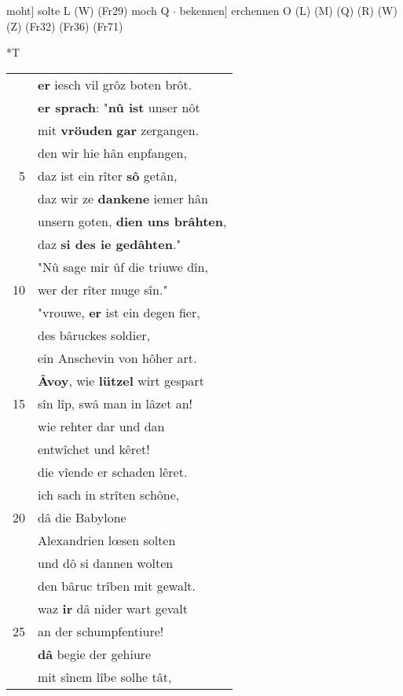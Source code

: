 \documentclass[8pt,a4paper,notitlepage]{article}
\begin{document}
\begin{table}[ht]
\begin{minipage}[t]{0.5\linewidth}
moht] solte L (W) (Fr29) moch Q  $\cdot$ bekennen] erchennen O (L) (M) (Q) (R) (W) (Z) (Fr32) (Fr36) (Fr71) \newline
\end{minipage}
\hspace{0.5cm}
\begin{minipage}[t]{0.5\linewidth}
\small
\begin{center}*T
\end{center}
\begin{tabular}{rl}
 & \textbf{er} iesch vil grôz boten brôt.\\ 
 & \textbf{er sprach}: "\textbf{nû ist} unser nôt\\ 
 & mit \textbf{vröuden} \textbf{gar} zergangen.\\ 
 & den wir hie hân enpfangen,\\ 
5 & daz ist ein rîter \textbf{sô} getân,\\ 
 & daz wir ze \textbf{dankene} iemer hân\\ 
 & unsern goten, \textbf{dien uns brâhten},\\ 
 & daz \textbf{si des ie gedâhten}."\\ 
 & "Nû sage mir ûf die triuwe dîn,\\ 
10 & wer der rîter muge sîn."\\ 
 & "vrouwe, \textbf{er} ist ein degen fier,\\ 
 & des bâruckes soldier,\\ 
 & ein Anschevin von hôher art.\\ 
 & \textbf{Âvoy}, wie \textbf{lützel} wirt gespart\\ 
15 & sîn lîp, swâ man in lâzet an!\\ 
 & wie rehter dar und dan\\ 
 & entwîchet und kêret!\\ 
 & die vîende er schaden lêret.\\ 
 & ich sach in strîten schône,\\ 
20 & dâ die Babylone\\ 
 & Alexandrien lœsen solten\\ 
 & und dô si dannen wolten\\ 
 & den bâruc trîben mit gewalt.\\ 
 & waz \textbf{ir} dâ nider wart gevalt\\ 
25 & an der schumpfentiure!\\ 
 & \textbf{dâ} begie der gehiure\\ 
 & mit sînem lîbe solhe tât,\\ 

\end{tabular}
\end{minipage}
\end{table}
\end{document}
